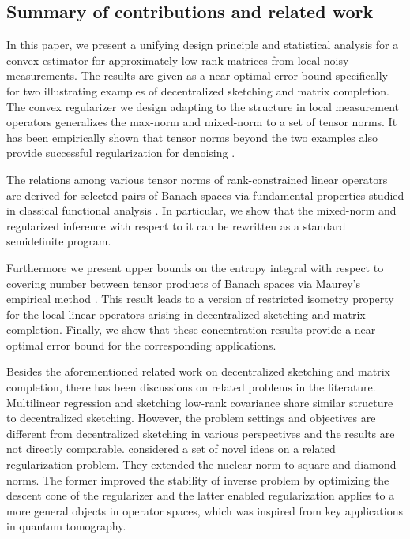 \documentclass[11pt]{article}
\begin{document}
\subsection{Summary of contributions and related work}

In this paper, we present a unifying design principle and statistical analysis for a convex estimator for approximately low-rank matrices from local noisy measurements. 
The results are given as a near-optimal error bound specifically for two illustrating examples of decentralized sketching and matrix completion. 
The convex regularizer we design adapting to the structure in local measurement operators generalizes the max-norm and mixed-norm to a set of tensor norms. 
It has been empirically shown that tensor norms beyond the two examples also provide successful regularization for denoising \citep{bruer2017recovering}.

The relations among various tensor norms of rank-constrained linear operators are derived for selected pairs of Banach spaces via fundamental properties studied in classical functional analysis \citep{jameson1987summing}. 
In particular, we show that the mixed-norm and regularized inference with respect to it can be rewritten as a standard semidefinite program. 

Furthermore we present upper bounds on the entropy integral with respect to covering number between tensor products of Banach spaces via Maurey's empirical method \citep{carl1985inequalities}. 
This result leads to a version of restricted isometry property for the local linear operators arising in decentralized sketching and matrix completion. 
Finally, we show that these concentration results provide a near optimal error bound for the corresponding applications. 

Besides the aforementioned related work on decentralized sketching and matrix completion, there has been discussions on related problems in the literature. 
Multilinear regression \citep{negahban2011estimation} and sketching low-rank covariance \citep{anaraki2014memory,azizyan2018extreme} share similar structure to decentralized sketching. 
However, the problem settings and objectives are different from decentralized sketching in various perspectives and the results are not directly comparable. 
\citet{kliesch2016improving} considered a set of novel ideas on a related regularization problem. 
They extended the nuclear norm to square and diamond norms. The former improved the stability of inverse problem by optimizing the descent cone of the regularizer and the latter enabled regularization applies to a more general objects in operator spaces, which was inspired from key applications in quantum tomography. 
\end{document}
